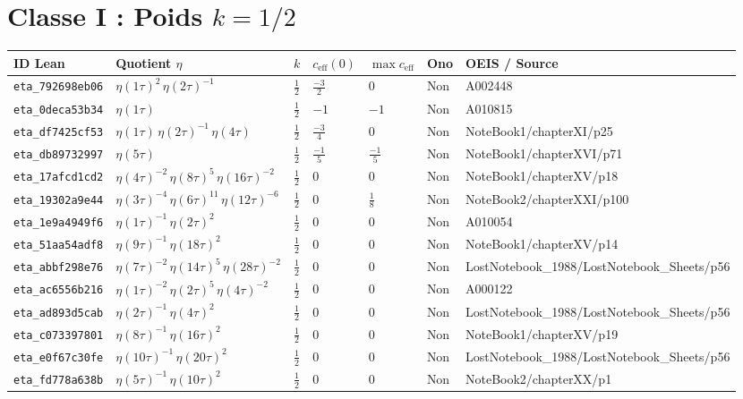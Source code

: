 \documentclass[11pt,twoside,openright]{book}
\begin{document}
\section{Classe I : Poids $k = 1/2$}
\begin{longtable}{p{2.3cm}p{4.3cm}llllp{2.3cm}}
\toprule
\textbf{ID Lean} & \textbf{Quotient $\eta$} & $k$ & $c_{\text{eff}}(0)$ & $\max c_{\text{eff}}$ & \textbf{Ono} & \textbf{OEIS / Source} \\
\midrule
\endhead
\texttt{eta\_792698eb06} & $\eta(1\tau)^{2}\, \eta(2\tau)^{-1}$ & $\frac{1}{2}$ & $\frac{-3}{2}$ & $0$ & Non & A002448 \\
\texttt{eta\_0deca53b34} & $\eta(1\tau)$ & $\frac{1}{2}$ & $-1$ & $-1$ & Non & A010815 \\
\texttt{eta\_df7425cf53} & $\eta(1\tau)\, \eta(2\tau)^{-1}\, \eta(4\tau)$ & $\frac{1}{2}$ & $\frac{-3}{4}$ & $0$ & Non & NoteBook1/chapterXI/p25 \\
\texttt{eta\_db89732997} & $\eta(5\tau)$ & $\frac{1}{2}$ & $\frac{-1}{5}$ & $\frac{-1}{5}$ & Non & NoteBook1/chapterXVI/p71 \\
\texttt{eta\_17afcd1cd2} & $\eta(4\tau)^{-2}\, \eta(8\tau)^{5}\, \eta(16\tau)^{-2}$ & $\frac{1}{2}$ & $0$ & $0$ & Non & NoteBook1/chapterXV/p18 \\
\texttt{eta\_19302a9e44} & $\eta(3\tau)^{-4}\, \eta(6\tau)^{11}\, \eta(12\tau)^{-6}$ & $\frac{1}{2}$ & $0$ & $\frac{1}{8}$ & Non & NoteBook2/chapterXXI/p100 \\
\texttt{eta\_1e9a4949f6} & $\eta(1\tau)^{-1}\, \eta(2\tau)^{2}$ & $\frac{1}{2}$ & $0$ & $0$ & Non & A010054 \\
\texttt{eta\_51aa54adf8} & $\eta(9\tau)^{-1}\, \eta(18\tau)^{2}$ & $\frac{1}{2}$ & $0$ & $0$ & Non & NoteBook1/chapterXV/p14 \\
\texttt{eta\_abbf298e76} & $\eta(7\tau)^{-2}\, \eta(14\tau)^{5}\, \eta(28\tau)^{-2}$ & $\frac{1}{2}$ & $0$ & $0$ & Non & LostNotebook\_1988/LostNotebook\_Sheets/p56 \\
\texttt{eta\_ac6556b216} & $\eta(1\tau)^{-2}\, \eta(2\tau)^{5}\, \eta(4\tau)^{-2}$ & $\frac{1}{2}$ & $0$ & $0$ & Non & A000122 \\
\texttt{eta\_ad893d5cab} & $\eta(2\tau)^{-1}\, \eta(4\tau)^{2}$ & $\frac{1}{2}$ & $0$ & $0$ & Non & LostNotebook\_1988/LostNotebook\_Sheets/p56 \\
\texttt{eta\_c073397801} & $\eta(8\tau)^{-1}\, \eta(16\tau)^{2}$ & $\frac{1}{2}$ & $0$ & $0$ & Non & NoteBook1/chapterXV/p19 \\
\texttt{eta\_e0f67c30fe} & $\eta(10\tau)^{-1}\, \eta(20\tau)^{2}$ & $\frac{1}{2}$ & $0$ & $0$ & Non & LostNotebook\_1988/LostNotebook\_Sheets/p56 \\
\texttt{eta\_fd778a638b} & $\eta(5\tau)^{-1}\, \eta(10\tau)^{2}$ & $\frac{1}{2}$ & $0$ & $0$ & Non & NoteBook2/chapterXX/p1 \\
\bottomrule
\end{longtable}
\end{document}
